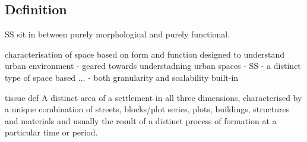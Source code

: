 \subsection{Definition}
\label{ssec:ss_def}






SS sit in between purely morphological and purely functional.

characterisation of space based on form and function designed to understand urban environment
- geared towards understadning urban spaces
- SS - a distinct type of space based ...
- both granularity and scalability built-in

tissue def A distinct area of a settlement in all three dimensions,
characterised by a unique combination of streets, blocks/plot series, plots,
buildings, structures and materials and usually the result of a distinct process
of formation at a particular time or period.











